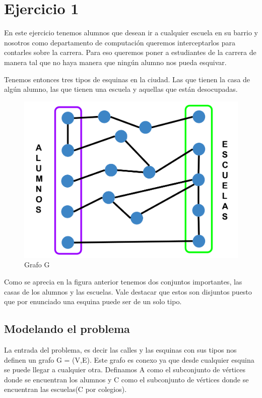 \section{Ejercicio 1}

En este ejercicio tenemos alumnos que desean ir a cualquier escuela en su barrio y nosotros como departamento de computación queremos interceptarlos para contarles sobre la carrera. Para eso queremos poner a estudiantes de la carrera de manera tal que no haya manera que ningún alumno nos pueda esquivar.

Tenemos entonces tres tipos de esquinas en la ciudad. Las que tienen la casa de algún alumno, las que tienen una escuela y aquellas que están desocupadas.

\begin{figure}[h]
  \centering
    \includegraphics[scale = 0.225]{img/esquema.png}
    \caption{Grafo G}
\end{figure}

Como se aprecia en la figura anterior tenemos dos conjuntos importantes, las casas de los alumnos y las escuelas. Vale destacar que estos son disjuntos puesto que por enunciado una esquina puede ser de un solo tipo.

\subsection{Modelando el problema}

La entrada del problema, es decir las calles y las esquinas con sus tipos nos definen un grafo G = (V,E). 
Este grafo es conexo 
ya que desde cualquier esquina se puede llegar a cualquier otra. Definamos A como el subconjunto de vértices 
donde se encuentran los alumnos y C como el subconjunto de vértices donde se encuentran las escuelas(C por colegios).

